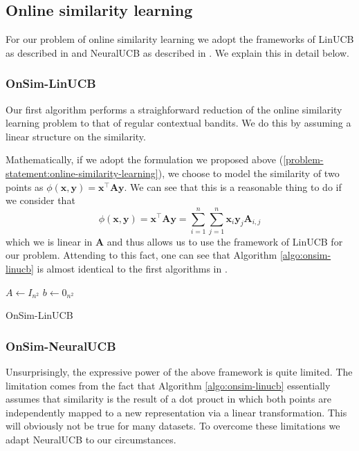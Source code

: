 \documentclass{article}
\begin{document}
\subsection{Online similarity learning}
For our problem of online similarity learning we adopt the frameworks of  LinUCB  as described in \cite{linucb} and  NeuralUCB as described in \cite{neuralucb}. We explain this in detail below.

\subsubsection{OnSim-LinUCB}
Our first algorithm performs a straighforward reduction of the online similarity learning problem to that of regular contextual bandits. We do this by assuming a linear structure on the similarity.

Mathematically, if we adopt the formulation we proposed above (\ref{problem-statement:online-similarity-learning}), we choose to model the similarity of two points as  $\phi(\mathbf{x}, \mathbf{y}) = \mathbf{x}^\top \mathbf{A} \mathbf{y}$.
We can see that this is a reasonable thing to do if we consider that
\[\phi(\mathbf{x}, \mathbf{y}) = \mathbf{x}^\top \mathbf{A} \mathbf{y} = \sum_{i =1}^n\sum_{j=1}^n \mathbf{x}_i \mathbf{y}_j \mathbf{A}_{i,j} \]
which we is linear in $\mathbf{A}$ and thus allows us to use the framework of LinUCB for our problem.
Attending to this fact, one can see that Algorithm \ref{algo:onsim-linucb} is almost identical to the first algorithms in \cite{linucb}.
\begin{algorithm}
  \label{algo:onsim-linucb}
    $A \gets I_{n^2}$\;
    $b \gets 0_{n^2}$\;
    \caption{OnSim-LinUCB}
\end{algorithm}

\subsubsection{OnSim-NeuralUCB}
Unsurprisingly, the expressive power of the above framework is quite limited.
The limitation comes from the fact that Algorithm \ref{algo:onsim-linucb} essentially assumes that similarity is the result
of a dot prouct in which both points are independently mapped to a new representation via a linear transformation. This will obviously not be true for many datasets.
To overcome these limitations we adapt NeuralUCB \cite{neuralucb} to our circumstances.
\end{document}
